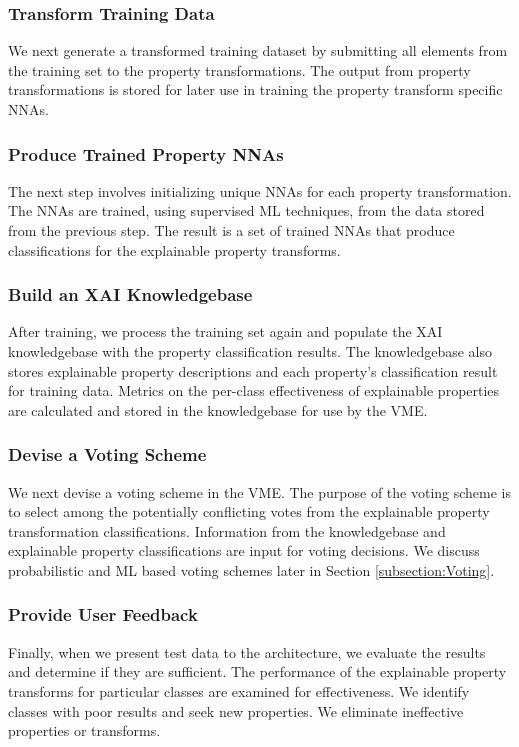 \documentclass[conference]{IEEEtran}
\begin{document}
\subsubsection{Transform Training Data} 
We next generate a transformed training dataset by submitting all elements from the training set to the property transformations.  The output from property transformations is stored for later use in training the property transform specific NNAs. 

\subsubsection{Produce Trained Property NNAs}
The next step involves initializing unique NNAs for each property transformation.  The NNAs are trained, using supervised ML techniques, from the data stored from the previous step.  The result is a set of trained NNAs that produce classifications for the explainable property transforms.

\subsubsection{Build an XAI Knowledgebase}
After training, we process the training set again and populate the XAI knowledgebase with the property classification results.  The knowledgebase also stores explainable property descriptions and each property's classification result for training data.  Metrics on the per-class effectiveness of explainable properties are calculated and stored in the knowledgebase for use by the VME.

\subsubsection{Devise a Voting Scheme}
We next devise a voting scheme in the VME.  The purpose of the voting scheme is to select among the potentially conflicting votes from the explainable property transformation classifications.  Information from the knowledgebase and explainable property classifications are input for voting decisions.  We discuss probabilistic and ML based voting schemes later in Section \ref{subsection:Voting}.

\subsubsection{Provide User Feedback}
Finally, when we present test data to the architecture, we evaluate the results and determine if they are sufficient.  The performance of the explainable property transforms for particular classes are examined for effectiveness.  We identify classes with poor results and seek new properties.  We eliminate ineffective properties or transforms.
\end{document}
